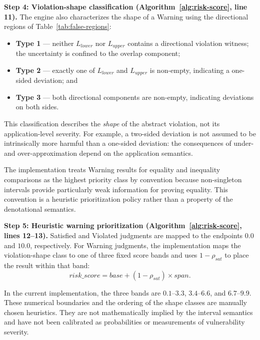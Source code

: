 \documentclass[pdflatex,sn-basic]{sn-jnl}%
\theoremstyle{thmstyleone}%
\theoremstyle{thmstyletwo}%
\theoremstyle{thmstylethree}%
\begin{document}
\smallskip
\noindent\textbf{Step 4: Violation-shape classification
(Algorithm~\ref{alg:risk-score}, line 11).}
The engine also characterizes the shape of a Warning using the directional
regions of Table~\ref{tab:false-regions}:
\begin{itemize}
    \item \textbf{Type 1} --- neither $L_{\mathit{lower}}$ nor
    $L_{\mathit{upper}}$ contains a directional violation witness;
    the uncertainty is confined to the overlap component;

    \item \textbf{Type 2} --- exactly one of
    $L_{\mathit{lower}}$ and $L_{\mathit{upper}}$ is non-empty,
    indicating a one-sided deviation; and

    \item \textbf{Type 3} --- both directional components are non-empty,
    indicating deviations on both sides.
\end{itemize}

This classification describes the \emph{shape} of the abstract violation,
not its application-level severity.
For example, a two-sided deviation is not assumed to be intrinsically more
harmful than a one-sided deviation: the consequences of under- and
over-approximation depend on the application semantics.

The implementation treats Warning results for equality and inequality
comparisons as the highest priority class by convention because non-singleton
intervals provide particularly weak information for proving equality.
This convention is a heuristic prioritization policy rather than a property of
the denotational semantics.


\smallskip
\noindent\textbf{Step 5: Heuristic warning prioritization
(Algorithm~\ref{alg:risk-score}, lines 12--13).}
Satisfied and Violated judgments are mapped to the endpoints $0.0$ and $10.0$,
respectively.
For Warning judgments, the implementation maps the violation-shape class to
one of three fixed score bands and uses
$1-\rho_{\mathit{sat}}$ to place the result within that band:
\[
\mathit{risk\_score}
=
\mathit{base}
+
(1-\rho_{\mathit{sat}})\times\mathit{span}.
\]

In the current implementation, the three bands are
$0.1$--$3.3$, $3.4$--$6.6$, and $6.7$--$9.9$.
These numerical boundaries and the ordering of the shape classes are manually
chosen heuristics.
They are not mathematically implied by the interval semantics and have not
been calibrated as probabilities or measurements of vulnerability severity.
\end{document}
